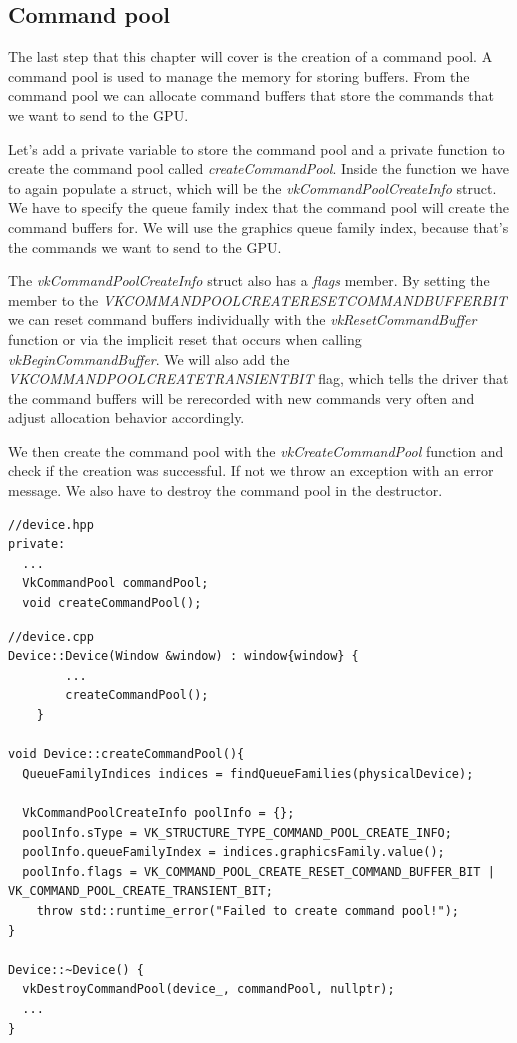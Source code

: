 \documentclass[12pt]{report} \usepackage{preamble}
\begin{document}
\subsection{Command pool}

The last step that this chapter will cover is the creation of a command pool. A command pool is used
to manage the memory for storing buffers. From the command pool we can allocate command buffers that
store the commands that we want to send to the \ac{GPU}.

Let's add a private variable to store the command pool and a private function to create the command pool
called \textit{createCommandPool}. Inside the function we have to again populate a struct, which will be
the \textit{vkCommandPoolCreateInfo} struct. We have to specify the queue family index that the command pool
will create the command buffers for. We will use the graphics queue family index, because that's the commands
we want to send to the \ac{GPU}.

The \textit{vkCommandPoolCreateInfo} struct also has a \textit{flags} member. By setting the member to the
\textit{VK\textunderscore COMMAND\textunderscore POOL\textunderscore CREATE\textunderscore RESET\textunderscore COMMAND\textunderscore BUFFER\textunderscore BIT}
we can reset command buffers individually with the \textit{vkResetCommandBuffer} function or via the implicit
reset that occurs when calling \textit{vkBeginCommandBuffer}. We will also add the
\textit{VK\textunderscore COMMAND\textunderscore POOL\textunderscore CREATE\textunderscore TRANSIENT\textunderscore BIT}
flag, which tells the driver that the command buffers will be rerecorded with new commands very often and adjust allocation
behavior accordingly.

We then create the command pool with the \textit{vkCreateCommandPool} function and check if the creation
was successful. If not we throw an exception with an error message. We also have to destroy the command pool
in the destructor.

\begin{lstlisting}[Language=C++]
//device.hpp
private:
  ...
  VkCommandPool commandPool;
  void createCommandPool();
\end{lstlisting}

\begin{lstlisting}[Language=C++]
//device.cpp
Device::Device(Window &window) : window{window} {
		...
		createCommandPool();
	}

void Device::createCommandPool(){
  QueueFamilyIndices indices = findQueueFamilies(physicalDevice);

  VkCommandPoolCreateInfo poolInfo = {};
  poolInfo.sType = VK_STRUCTURE_TYPE_COMMAND_POOL_CREATE_INFO;
  poolInfo.queueFamilyIndex = indices.graphicsFamily.value();
  poolInfo.flags = VK_COMMAND_POOL_CREATE_RESET_COMMAND_BUFFER_BIT | VK_COMMAND_POOL_CREATE_TRANSIENT_BIT;
    throw std::runtime_error("Failed to create command pool!");
}

Device::~Device() {
  vkDestroyCommandPool(device_, commandPool, nullptr);
  ...
}
\end{lstlisting}
\end{document}
